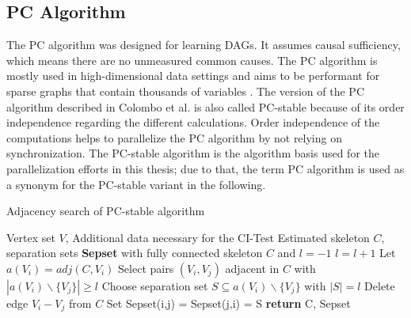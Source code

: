 \subsection{PC Algorithm}
The PC algorithm was designed for learning DAGs. It assumes causal sufficiency, which means there are no unmeasured common causes. The PC algorithm is mostly used in high-dimensional data settings and aims to be performant for sparse graphs that contain thousands of variables \cite{kalischUnderstandingHumanFunctioning2010}.
The version of the PC algorithm described in Colombo et al. \cite{colomboOrderIndependentConstraintBasedCausal} is also called PC-stable because of its order independence regarding the different calculations. Order independence of the computations helps to parallelize the PC algorithm by not relying on synchronization. The PC-stable algorithm is the algorithm basis used for the parallelization efforts in this thesis; due to that, the term PC algorithm is used as a synonym for the PC-stable variant in the following.

\begin{algorithm}
    \caption{Adjacency search of PC-stable algorithm \cite{colomboOrderIndependentConstraintBasedCausal}}
    \label{alg:pcstable}
    \begin{algorithmic}[1]
    \Require Vertex set $V$, Additional data necessary for the CI-Test
    \Ensure Estimated skeleton $C$, separation sets \textbf{Sepset}
    \State with fully connected skeleton $C$ and $l = -1$
    \Repeat 
        \State $l=l+1$
            \State Let $a(V_i) = adj(C,V_i)$ \label{alg:pcstable_adjlist}
        \EndFor
        \Repeat \label{alg:pcstable_edgeloop}
            \State Select pairs $(V_i,V_j)$ adjacent in $C$ with $|a(V_i)\backslash\{V_j\}| \geq l$
            \Repeat
                \State Choose separation set $S \subseteq a(V_i ) \backslash \{V_j \}$ with $| S | = l$ \label{alg:pcstable_sepsbuild}
                 \label{alg:pcstable_alpha}
                    \State Delete edge $V_i - V_j$ from $C$
                    \State Set Sepset(i,j) = Sepset(j,i) = S
                \EndIf
    \State \textbf{return} C, Sepset
    \end{algorithmic}
\end{algorithm}

